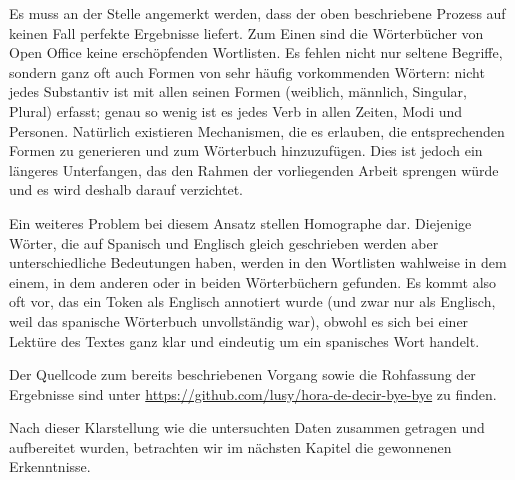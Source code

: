 Es muss an der Stelle angemerkt werden, dass der oben beschriebene Prozess auf keinen Fall perfekte Ergebnisse liefert.
Zum Einen sind die Wörterbücher von Open Office keine erschöpfenden Wortlisten.
Es fehlen nicht nur seltene Begriffe, sondern ganz oft auch Formen von sehr häufig vorkommenden Wörtern:
nicht jedes Substantiv ist mit allen seinen Formen (weiblich, männlich, Singular, Plural) erfasst;
genau so wenig ist es jedes Verb in allen Zeiten, Modi und Personen.
Natürlich existieren Mechanismen, die es erlauben, die entsprechenden Formen zu generieren und zum Wörterbuch hinzuzufügen.
Dies ist jedoch ein längeres Unterfangen, das den Rahmen der vorliegenden Arbeit sprengen würde und es wird deshalb darauf verzichtet.

Ein weiteres Problem bei diesem Ansatz stellen Homographe dar.
Diejenige Wörter, die auf Spanisch und Englisch gleich geschrieben werden aber unterschiedliche Bedeutungen haben, werden in den Wortlisten wahlweise in dem einem, in dem anderen oder in beiden Wörterbüchern gefunden.
Es kommt also oft vor, das ein Token als Englisch annotiert wurde (und zwar nur als Englisch, weil das spanische Wörterbuch unvollständig war), obwohl es sich bei einer Lektüre des Textes ganz klar und eindeutig um ein spanisches Wort handelt.

Der Quellcode zum bereits beschriebenen Vorgang sowie die Rohfassung der Ergebnisse sind unter \url{https://github.com/lusy/hora-de-decir-bye-bye} zu finden.

Nach dieser Klarstellung wie die untersuchten Daten zusammen getragen und aufbereitet wurden, betrachten wir im nächsten Kapitel die gewonnenen Erkenntnisse.

